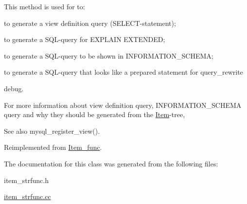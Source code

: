 This method is used for to\+:
\begin{DoxyItemize}
\item to generate a view definition query (S\+E\+L\+E\+CT-\/statement);
\item to generate a S\+QL-\/query for E\+X\+P\+L\+A\+IN E\+X\+T\+E\+N\+D\+ED;
\item to generate a S\+QL-\/query to be shown in I\+N\+F\+O\+R\+M\+A\+T\+I\+O\+N\+\_\+\+S\+C\+H\+E\+MA;
\item to generate a S\+QL-\/query that looks like a prepared statement for query\+\_\+rewrite
\item debug.
\end{DoxyItemize}

For more information about view definition query, I\+N\+F\+O\+R\+M\+A\+T\+I\+O\+N\+\_\+\+S\+C\+H\+E\+MA query and why they should be generated from the \mbox{\hyperlink{classItem}{Item}}-\/tree, \begin{DoxySeeAlso}{See also}
mysql\+\_\+register\+\_\+view(). 
\end{DoxySeeAlso}


Reimplemented from \mbox{\hyperlink{classItem__func_afb302ee25d4721ace27d3f5053d4ee41}{Item\+\_\+func}}.



The documentation for this class was generated from the following files\+:\begin{DoxyCompactItemize}
\item 
item\+\_\+strfunc.\+h\item 
\mbox{\hyperlink{item__strfunc_8cc}{item\+\_\+strfunc.\+cc}}\end{DoxyCompactItemize}
